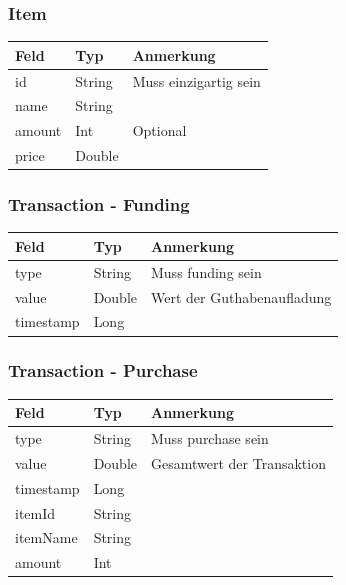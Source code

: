 \documentclass[a4paper, 11pt]{article}
\begin{document}
\subsubsection*{Item}
\label{subsubsec:attachments:schemas:item}
\begin{table}[H]
	\centering
	\begin{tabular}{@{}lll@{}}
		Feld   & Typ    & Anmerkung             \\ \toprule
		id     & String & Muss einzigartig sein \\ \midrule
		name   & String &                       \\ \midrule
		amount & Int    & Optional              \\ \midrule
		price  & Double &                       \\ \bottomrule
	\end{tabular}
	\label{tab:attachments:schemas:item}
\end{table}

\subsubsection*{Transaction - Funding}
\label{subsubsec:attachments:schemas:funding}
\begin{table}[H]
	\centering
	\begin{tabular}{@{}lll@{}}
		Feld      & Typ    & Anmerkung                      \\ \toprule
		type      & String & Muss \glqq funding\grqq{} sein \\ \midrule
		value     & Double & Wert der Guthabenaufladung     \\ \midrule
		timestamp & Long   &                                \\ \bottomrule
	\end{tabular}
	\label{tab:attachments:schemas:funding}
\end{table}

\subsubsection*{Transaction - Purchase}
\label{subsubsec:attachments:schemas:purchase}
\begin{table}[H]
	\centering
	\begin{tabular}{@{}lll@{}}
		Feld      & Typ    & Anmerkung                       \\ \toprule
		type      & String & Muss \glqq purchase\grqq{} sein \\ \midrule
		value     & Double & Gesamtwert der Transaktion      \\ \midrule
		timestamp & Long   &                                 \\ \midrule
		itemId    & String &                                 \\ \midrule
		itemName  & String &                                 \\ \midrule
		amount    & Int    &                                 \\ \bottomrule
	\end{tabular}
	\label{tab:attachments:schemas:purchase}
\end{table}
\end{document}
